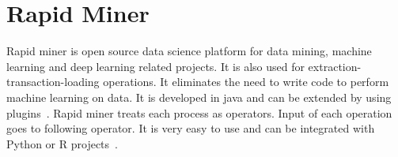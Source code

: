 \section{Rapid Miner}

Rapid miner is open source data science platform for data mining, machine
learning and deep learning related projects. It is also used for
extraction-transaction-loading operations. It eliminates the need to write code
to perform machine learning on data. It is developed in java and can be extended
 by using plugins~\cite{hid-sp18-502-RapidMiner}.
Rapid miner treats each process as operators. Input of each operation goes to
following operator. It is very easy to use and can be integrated with Python or
R projects~\cite{hid-sp18-502-RapidMiner}.



